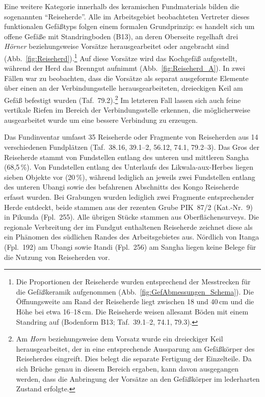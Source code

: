 Eine weitere Kategorie innerhalb des keramischen Fundmaterials bilden die sogenannten \enquote{Reiseherde}. Alle im Arbeitsgebiet beobachteten Vertreter dieses funktionalen Gefäßtyps folgen einem formalen Grundprinzip: es handelt sich um offene Gefäße mit Standringboden (B13), an deren Oberseite regelhaft drei \textit{Hörner} beziehungsweise Vorsätze herausgearbeitet oder angebracht sind (Abb.~\ref{fig:Reiseherd}).\footnote{Die Proportionen der Reiseherde wurden entsprechend der Messtrecken für die Gefäßkeramik aufgenommen (Abb.~\ref{fig:GefAbmessungen_Schema}). Die Öffnungsweite am Rand der Reiseherde liegt zwischen 18 und 40\,cm und die Höhe bei etwa 16--18\,cm. Die Reiseherde weisen allesamt Böden mit einem Standring auf (Bodenform B13; Taf.~39.1--2, 74.1, 79.3).} Auf diese Vorsätze wird das Kochgefäß aufgestellt, während der Herd das Brenngut aufnimmt (Abb.~\ref{fig:Reiseherd_A}). In zwei Fällen war zu beobachten, dass die Vorsätze als separat ausgeformte Elemente über einen an der Verbindungsstelle herausgearbeiteten, dreieckigen Keil am Gefäß befestigt wurden (Taf.~79.2).\footnote{Am \textit{Horn} beziehungsweise dem Vorsatz wurde ein dreieckiger Keil herausgearbeitet, der in eine entsprechende Aussparung am Gefäßkörper des Reiseherdes eingreift. Dies belegt die separate Fertigung der Einzelteile. Da sich Brüche genau in diesem Bereich ergaben, kann davon ausgegangen werden, dass die Anbringung der Vorsätze an den Gefäßkörper im lederharten Zustand erfolgte.} Im letzteren Fall lassen sich auch feine vertikale Riefen im Bereich der Verbindungsstelle erkennen, die möglicherweise ausgearbeitet wurde um eine bessere Verbindung zu erzeugen.

Das Fundinventar umfasst 35 Reiseherde oder Fragmente von Reiseherden aus 14 verschiedenen Fundplätzen (Taf.~38.16, 39.1--2, 56.12, 74.1, 79.2--3). Das Gros der Reiseherde stammt von Fundstellen entlang des unteren und mittleren \mbox{Sangha} (68,5\,\%). Von Fundstellen entlang des Unterlaufs des \mbox{Likwala}-\mbox{aux}-\mbox{Herbes} liegen sieben Objekte vor (20\,\%), während lediglich an jeweils zwei Fundstellen entlang des unteren \mbox{Ubangi} sowie des befahrenen Abschnitts des Kongo Reiseherde erfasst wurden. Bei Grabungen wurden lediglich zwei Fragmente entsprechender Herde entdeckt, beide stammen aus der rezenten Grube PIK~87/2 (Kat.-Nr.~9) in Pikunda (Fpl.~255). Alle übrigen Stücke stammen aus Oberflächensurveys. Die regionale Verbreitung der im Fundgut enthaltenen Reiseherde zeichnet diese als ein Phänomen des südlichen Randes des Arbeitsgebietes aus. Nördlich von Itanga (Fpl.~192) am \mbox{Ubangi} sowie Itandi (Fpl.~256) am \mbox{Sangha} liegen keine Belege für die Nutzung von Reiseherden vor.

